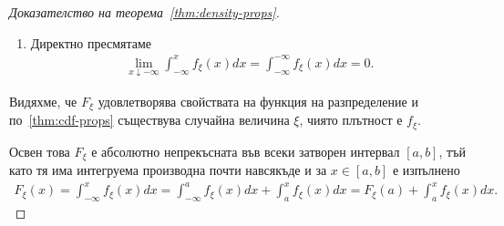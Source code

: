 \documentclass[numbers=endperiod, bibliography=totocnumbered]{scrartcl}
\begin{document}
\begin{proof}[Доказателство на теорема~\ref{thm:density-props}]
\begin{enumerate}
    \item Директно пресмятаме
    \begin{align*}
      \lim_{x \downarrow -\infty} \int_{-\infty}^x f_\xi(x) dx
      =
      \int_{-\infty}^{-\infty} f_\xi(x) dx
      =
      0.
    \end{align*}
  \end{enumerate}

  Видяхме, че \( F_\xi \) удовлетворява свойствата на функция на разпределение и по~\ref{thm:cdf-props} съществува случайна величина \( \xi \), чиято плътност е \( f_\xi \).

  Освен това \( F_\xi \) е абсолютно непрекъсната във всеки затворен интервал \( [a, b] \), тъй като тя има интегруема производна почти навсякъде и за \( x \in [a, b] \) е изпълнено
  \begin{align*}
    F_\xi(x)
    =
    \int_{-\infty}^x f_\xi(x) dx
    =
    \int_{-\infty}^a f_\xi(x) dx + \int_a^x f_\xi(x) dx
    =
    F_\xi(a) + \int_a^x f_\xi(x) dx.
  \end{align*}
\end{proof}
\end{document}
